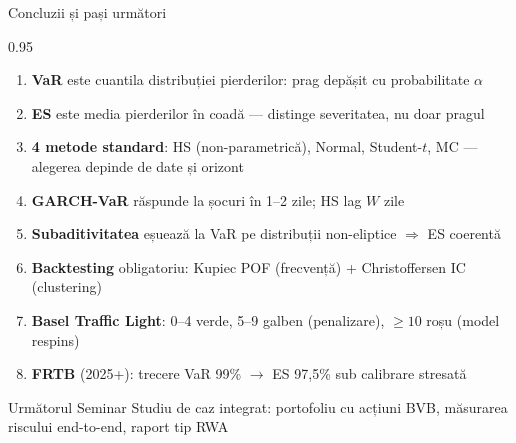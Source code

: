 \documentclass[9pt, aspectratio=169, t]{beamer}
\begin{document}
\begin{frame}[shrink=10]{Concluzii și pași următori}
\begin{cminipage}{0.95\textwidth}
    \begin{enumerate}\setlength{\itemsep}{0pt}
        \item \textbf{VaR} este cuantila distribuției pierderilor: prag depășit cu probabilitate $\alpha$
        \item \textbf{ES} este media pierderilor în coadă --- distinge severitatea, nu doar pragul
        \item \textbf{4 metode standard}: HS (non-parametrică), Normal, Student-$t$, MC --- alegerea depinde de date și orizont
        \item \textbf{GARCH-VaR} răspunde la șocuri în 1--2 zile; HS lag $W$ zile
        \item \textbf{Subaditivitatea} eșuează la VaR pe distribuții non-eliptice $\Rightarrow$ ES coerentă
        \item \textbf{Backtesting} obligatoriu: Kupiec POF (frecvență) + Christoffersen IC (clustering)
        \item \textbf{Basel Traffic Light}: 0--4 verde, 5--9 galben (penalizare), $\geq 10$ roșu (model respins)
        \item \textbf{FRTB} (2025+): trecere VaR 99\% $\to$ ES 97{,}5\% sub calibrare stresată
    \end{enumerate}

    \vspace{0.3cm}
    \begin{block}{Următorul Seminar}
        Studiu de caz integrat: portofoliu cu acțiuni BVB, măsurarea riscului end-to-end, raport tip RWA
    \end{block}
\end{cminipage}
\end{frame}
\end{document}
